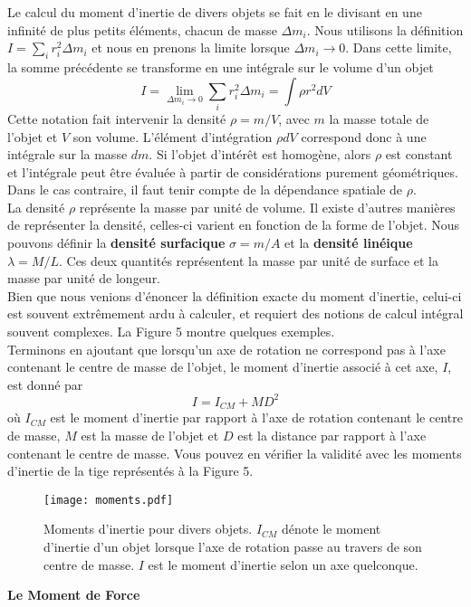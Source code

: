 \documentclass[titlepage,oneside,a4paper,11pt]{book} %
\begin{document}
Le calcul du moment d'inertie de divers objets se fait en le divisant en une infinité de plus petits éléments, chacun de masse $\Delta m_i$. Nous utilisons la définition $I=\sum_{i} r_{i}^{2} \Delta m_{i}$ et nous en prenons la limite lorsque $\Delta m_{i} \rightarrow 0$. Dans cette limite, la somme précédente se transforme en une intégrale sur le volume d'un objet
\begin{equation}
I=\lim _{\Delta m_{i} \rightarrow 0} \sum_{i} r_{i}^{2} \Delta m_{i}=\int \rho r^{2} dV
\end{equation}
Cette notation fait intervenir la densité $\rho=m/V$, avec $m$ la masse totale de l'objet et $V$ son volume. L'élément d'intégration $\rho dV$ correspond donc à une intégrale sur la masse $dm$. Si l'objet d'intérêt est homogène, alors $\rho$ est constant et l'intégrale peut être évaluée à partir de considérations purement géométriques. Dans le cas contraire, il faut tenir compte de la dépendance spatiale de $\rho$.\\

La densité $\rho$ représente la masse par unité de volume. Il existe d'autres manières de représenter la densité, celles-ci varient en fonction de la forme de l'objet. Nous pouvons définir la \textbf{densité surfacique} $\sigma = m/A$ et la \textbf{densité linéique} $\lambda = M/L$. Ces deux quantités représentent la masse par unité de surface et la masse par unité de longeur.\\

Bien que nous venions d'énoncer la définition exacte du moment d'inertie, celui-ci est souvent extrêmement ardu à calculer, et requiert des notions de calcul intégral souvent complexes. La Figure 5 montre quelques exemples.\\



Terminons en ajoutant que lorsqu'un axe de rotation ne correspond pas à l'axe contenant le centre de masse de l'objet, le moment d'inertie associé à cet axe, $I$, est donné par
\begin{equation}
I = I_{CM}+MD^2
\end{equation}
où $I_{CM}$ est le moment d'inertie par rapport à l'axe de rotation contenant le centre de masse, $M$ est la masse de l'objet et $D$ est la distance par rapport à l'axe contenant le centre de masse. Vous pouvez en vérifier la validité avec les moments d'inertie de la tige représentés à la Figure 5.

\begin{figure}[H]
\centering
\texttt{[image: moments.pdf]}
\caption{Moments d'inertie pour divers objets. $I_{CM}$ dénote le moment d'inertie d'un objet lorsque l'axe de rotation passe au travers de son centre de masse. $I$ est le moment d'inertie selon un axe quelconque.}
\end{figure}
\newpage
{\large \textbf{Le Moment de Force}}\\
\end{document}
